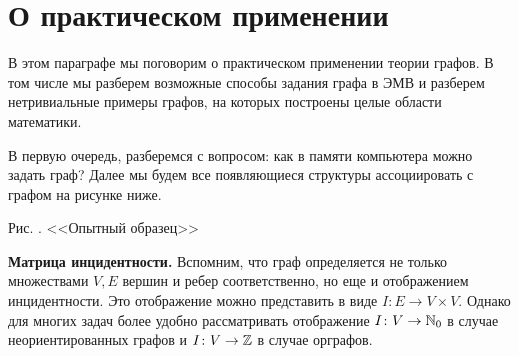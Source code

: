 \section{О практическом применении}

	В этом параграфе мы поговорим о практическом применении теории графов. В том числе мы разберем возможные способы задания графа в ЭМВ и разберем нетривиальные примеры графов, на которых построены целые области математики.


	В первую очередь, разберемся с вопросом: как в памяти компьютера можно задать граф? Далее мы будем все появляющиеся структуры ассоциировать с графом на рисунке ниже.

\begin{center}\end{center}
\begin{center}
	\small Рис. \images. <<Опытный образец>>
\end{center}	
	
	\textbf{Матрица инцидентности.} Вспомним, что граф определяется не только множествами $V, E$ вершин и ребер соответственно, но еще и отображением инцидентности. Это отображение можно представить в виде $I \colon E \to V \times V$. Однако для многих задач более удобно рассматривать отображение $I \colon V \to \mathbb{N}_0$ в случае неориентированных графов и $I \colon V \to \mathbb{Z}$ в случае орграфов.
	
